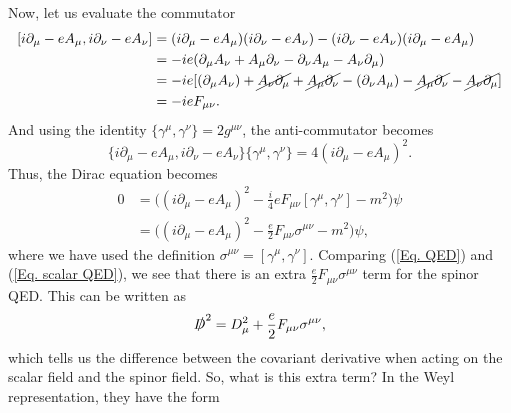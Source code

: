 \documentclass[11pt]{article}
\theoremstyle{definition}
\begin{document}
Now, let us evaluate the commutator
\begin{equation}
    \begin{aligned}
        [i\partial_\mu - eA_\mu,i\partial_\nu - eA_\nu] &= (i\partial_\mu - eA_\mu)(i\partial_\nu - eA_\nu) - (i\partial_\nu - eA_\nu)(i\partial_\mu - eA_\mu)\\
        &= - ie(\partial_\mu A_\nu  + A_\mu\partial_\nu - \partial_\nu A_\mu -  A_\nu\partial_\mu)\\
        &= -ie[(\partial_\mu A_\nu) + \cancel{A_\nu\partial_\mu} + \cancel{A_\mu\partial_\nu} - (\partial_\nu A_\mu) - \cancel{A_\mu\partial_\nu} -  \cancel{A_\nu\partial_\mu}]\\
        &= -ieF_{\mu\nu}.
    \end{aligned}
\end{equation}
And using the identity $\{\gamma^\mu,\gamma^\nu\} = 2g^{\mu\nu}$, the anti-commutator becomes
\begin{equation}
    \{i\partial_\mu - eA_\mu,i\partial_\nu - eA_\nu\}\{\gamma^\mu,\gamma^\nu\} = 4(i\partial_\mu - eA_\mu)^2.
\end{equation}
Thus, the Dirac equation becomes
\begin{equation}
\begin{aligned}
    0 &= \bigg( (i\partial_\mu - eA_\mu)^2 - \frac{i}{4}eF_{\mu\nu}[\gamma^\mu,\gamma^\nu] -m^2 \bigg)\psi\\
    &= \bigg( (i\partial_\mu - eA_\mu)^2 - \frac{e}{2}F_{\mu\nu}\sigma^{\mu\nu} -m^2 \bigg)\psi,
    \label{Eq. QED}
\end{aligned}
\end{equation}
where we have used the definition $\sigma^{\mu\nu} = [\gamma^\mu,\gamma^\nu]$. Comparing (\ref{Eq. QED}) and (\ref{Eq. scalar QED}), we see that there is an extra $\frac{e}{2}F_{\mu\nu}\sigma^{\mu\nu}$ term for the spinor QED. This can be written as
\begin{equation}
    \slashed{D}^2 = D_\mu^2 + \frac{e}{2}F_{\mu\nu}\sigma^{\mu\nu},
\end{equation}
which tells us the difference between the covariant derivative when acting on the scalar field and the spinor field. So, what is this extra term? In the Weyl representation, they have the form
\end{document}
